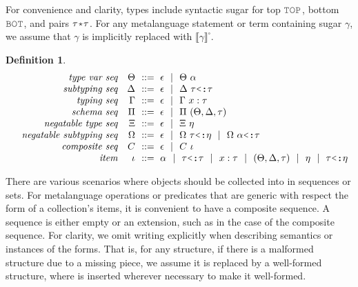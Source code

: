 \documentclass[acmsmall]{acmart}
\theoremstyle{definition}
\newtheorem{definition}{Definition}[section]
\begin{document}
\noindent
For convenience and clarity, types include syntactic sugar for top $\J{TOP}$, 
bottom $\J{BOT}$, and pairs $\tau \J{*} \tau$.
For any metalanguage statement or term containing sugar $\gamma$, we assume that $\gamma$ is implicitly replaced with $\llbracket \gamma \rrbracket^\square$.

\begin{definition}
  \label{def:sequence}
  \small
  \nopad
  \[\begin{array}[t]{rr@{}l}
    \com{type var seq} &
    \nonterm{\Theta} & \is \epsilon \sep \Theta\ \alpha 
    \\
    \com{subtyping seq} &
    \nonterm{\Delta} & \is \epsilon \sep \Delta \  \tau \J{<:} \tau
    \\
    \com{typing seq} &
    \nonterm{\Gamma} & \is \epsilon \sep \Gamma\ x \hastype \tau
    \\
    \com{schema seq} &
    \nonterm{\Pi} & \is \epsilon \sep \Pi\ (\Theta, \Delta, \tau) 
    \\
    \com{negatable type seq} &
    \nonterm{\Xi} & \is \epsilon \sep \Xi\ \eta 
    \\
    \com{negatable subtyping seq} &
    \nonterm{\Omega} & \is \epsilon \sep 
      \Omega\ \tau \J{<:} \eta \sep 
      \Omega\ \alpha \J{<:} \tau
    \\
    \com{composite seq} &
    \nonterm{C} & \is \epsilon \sep C\ \iota 
    \\
    \com{item} &
    \nonterm{\iota} & \is 
    \alpha
    \sep 
    \tau \J{<:} \tau
    \sep
    x \hastype \tau
    \sep
    (\Theta, \Delta, \tau)
    \sep
    \eta
    \sep
    \tau \J{<:} \eta

  \end{array}\]
\end{definition}


\noindent
There are various scenarios where objects should be collected into in sequences or sets.
For metalanguage operations or predicates that are generic with respect the form of a collection's items,
it is convenient to have a composite sequence.
A sequence is either empty \ms{\epsilon} or an extension,
such as  in the case of the composite sequence. 
For clarity, we omit writing \ms{\epsilon} explicitly when describing semantics or instances of the forms.
That is, for any structure, if there is a malformed structure due to a missing piece, 
we assume it is replaced by a well-formed structure, 
where \ms{\epsilon} is inserted wherever necessary to make it well-formed.
\end{document}
